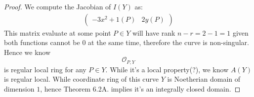 \begin{proof}
We compute the Jacobian of $I(Y)$ as:
\begin{align*}
    \begin{pmatrix}
        -3x^2+1(P) & 2y(P)
    \end{pmatrix}
\end{align*}
This matrix evaluate at some point $P\in Y$ will have rank $n-r=2-1=1$ given both functions cannot be $0$ at the same time, therefore the curve is non-singular. Hence we know 
\[\mathscr O_{P,Y}\] is regular local ring for any $P\in Y$. While it's a local property(?), we know $A(Y)$ is regular local. While coordinate ring of this curve $Y$ is Noetherian domain of dimension $1$, hence Theorem 6.2A. implies it's an integrally closed domain.

\end{proof}